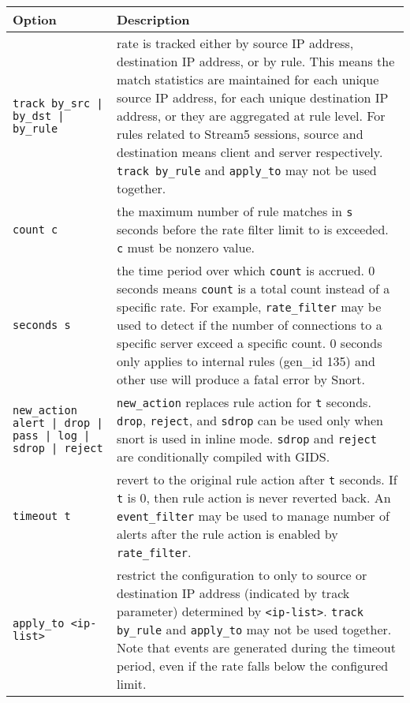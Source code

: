 \documentclass[english]{report}
\begin{document}
\begin{table}[h]
\begin{center}
\begin{tabular}{| p{2in} | p{4in} |}

\hline
\textbf{Option} & \textbf{Description}\\
\hline

\hline
\texttt{track by\_src | by\_dst | by\_rule} &

rate is tracked either by source IP address, destination IP address, or by
rule.  This means the match statistics are maintained for each unique source IP
address, for each unique destination IP address, or they are aggregated at rule
level.  For rules related to Stream5 sessions, source and destination means
client and server respectively.  \texttt{track by\_rule} and \texttt{apply\_to}
may not be used together.\\

\hline
\texttt{count c} &

the maximum number of rule matches in \texttt{s} seconds before the rate filter
limit to is exceeded.  \texttt{c} must be nonzero value.\\

\hline
\texttt{seconds s} &

the time period over which \texttt{count} is accrued. 0 seconds means
\texttt{count} is a total count instead of a specific rate.  For example,
\texttt{rate\_filter} may be used to detect if the number of connections to a
specific server exceed a specific count.  0 seconds only applies to internal
rules (gen\_id 135) and other use will produce a fatal error by Snort.\\

\hline
\texttt{new\_action alert | drop | pass | log | sdrop | reject} &

\texttt{new\_action} replaces rule action for \texttt{t} seconds.
\texttt{drop}, \texttt{reject}, and \texttt{sdrop} can be used only when snort
is used in inline mode.  \texttt{sdrop} and \texttt{reject} are conditionally
compiled with GIDS.\\

\hline
\texttt{timeout t} &

revert to the original rule action after \texttt{t} seconds.  If \texttt{t} is
0, then rule action is never reverted back.  An \texttt{event\_filter} may be
used to manage number of alerts after the rule action is enabled by
\texttt{rate\_filter}.\\

\hline
\texttt{apply\_to <ip-list>} &

restrict the configuration to only to source or destination IP address
(indicated by track parameter) determined by \texttt{<ip-list>}.  \texttt{track
by\_rule} and \texttt{apply\_to} may not be used together.  Note that events
are generated during the timeout period, even if the rate falls below the
configured limit.\\

\hline
\end{tabular}
\end{center}
\end{table}
\end{document}
